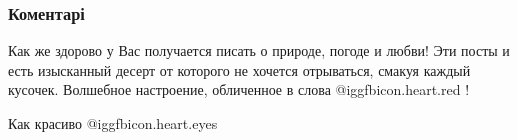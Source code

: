  
 
 
 
 
\subsubsection{Коментарі}
\label{sec:16_09_2021.fb.krjukova_svetlana.1.gorod_ljubvi_igry_kontrastov.cmt}

\begin{itemize} %
Как же здорово у Вас получается писать о природе, погоде и любви! Эти посты и есть изысканный десерт от которого не хочется отрываться, смакуя каждый кусочек. Волшебное настроение, обличенное в слова @igg{fbicon.heart.red} !

Как красиво  @igg{fbicon.heart.eyes} 
\end{itemize} %
